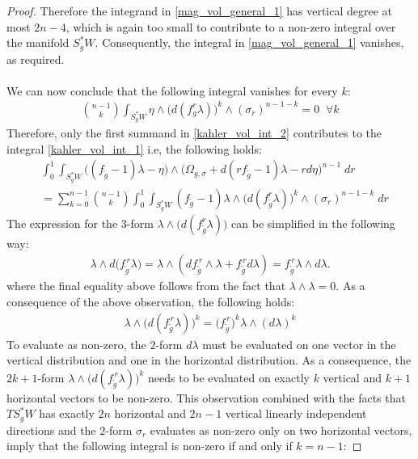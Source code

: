\documentclass[11pt]{amsart}
\theoremstyle{plain}
\theoremstyle{definition}
\theoremstyle{remark}
\begin{document}
\begin{proof}
Therefore the integrand in \eqref{mag_vol_general_1} has vertical degree at most $2n-4$, which is again too small to contribute to a non-zero integral over the manifold $S_g^*W$. Consequently, the integral in \eqref{mag_vol_general_1} vanishes, as required.\\
\\
We can now conclude that the following integral vanishes for every $k$:
\begin{align}
    \binom{n-1}{k}\int_{S^*_gW} \eta \wedge \big(d(f_g^r\lambda) \big)^k \wedge (\sigma_r)^{n-1-k}  = 0 \;\; \forall k
\end{align}
Therefore, only the first summand in \eqref{kahler_vol_int_2} contributes to the integral \eqref{kahler_vol_int_1} i.e, the following holds:
\begin{align}\label{kahler_vol_3}
&\int^1_0\int_{S^*_gW} \big((f_{\tilde g}-1)\lambda - \eta\big) \wedge\bigg(\Omega_{g,\sigma} + d(rf_{\tilde g}-1)\lambda - rd\eta \bigg)^{n-1} \; dr \\\nonumber &= \sum^{n-1}_{k=0}  \binom{n-1}{k} \int^1_0\int_{S^*_gW} (f_{\tilde g}-1)\lambda \wedge \big(d(f^r_{\tilde g}\lambda)\big)^k \wedge (\sigma_r)^{n-1-k} \; dr
\end{align}
The expression for the $3$-form $\lambda \wedge \big(d(f^r_{\tilde g}\lambda)\big)$ can be simplified in the following way:
\begin{align}
   \lambda \wedge d\bigl(f_{\tilde g}^{\,r}\lambda\bigr)
=
\lambda \wedge
\left(df_{\tilde g}^{\,r}\wedge \lambda
+
f_{\tilde g}^{\,r}d\lambda\right)
=
f_{\tilde g}^{\,r}\lambda\wedge d\lambda.
\end{align}
where the final equality above follows from the fact that $\lambda \wedge \lambda =0$. As a consequence of the above observation, the following holds:
\begin{align}
    \lambda \wedge \bigl(d(f_{\tilde g}^{\,r}\lambda)\bigr)^{k}
=
\bigl(f_{\tilde g}^{\,r}\bigr)^{k}
\lambda \wedge (d\lambda)^{k}
\end{align}
To evaluate as non-zero, the $2$-form $d\lambda$ must be evaluated on one vector in the vertical distribution and one in the horizontal distribution. As a consequence, the $2k+1$-form $ \lambda \wedge \bigl(d(f_{\tilde g}^{\,r}\lambda)\bigr)^{k}$ needs to be evaluated on exactly $k$ vertical and $k+1$ horizontal vectors to be non-zero. This observation combined with the facts that $TS^*_gW$ has exactly $2n$ horizontal and $2n-1$ vertical linearly independent directions and the $2$-form $\sigma_r$ evaluates as non-zero only on two horizontal vectors, imply that the following integral is non-zero if and only if $k=n-1$:

\end{proof}
\end{document}
